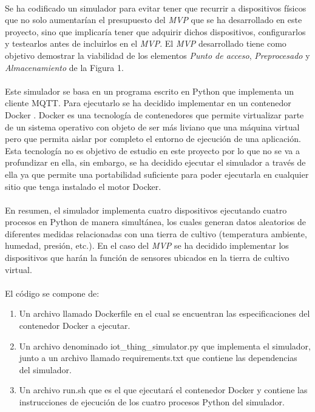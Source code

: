 \documentclass[../../memoria.tex]{subfiles}
\begin{document}
\paragraph{}
Se ha codificado un simulador para evitar tener que recurrir a dispositivos físicos que no solo aumentarían el presupuesto del \textit{MVP} que se ha desarrollado en este proyecto, sino que implicaría tener que adquirir dichos dispositivos, configurarlos y testearlos antes de incluirlos en el \textit{MVP}. El \textit{MVP} desarrollado tiene como objetivo demostrar la viabilidad de los elementos \textit{Punto de acceso}, \textit{Preprocesado} y \textit{Almacenamiento} de la Figura 1.



\paragraph{}
Este simulador se basa en un programa escrito en Python que implementa un cliente MQTT. Para ejecutarlo se ha decidido implementar en un contenedor Docker \cite{docker}. Docker es una tecnología de contenedores que permite virtualizar parte de un sistema operativo con objeto de ser más liviano que una máquina virtual pero que permita aislar por completo el entorno de ejecución de una aplicación. Esta tecnología no es objetivo de estudio en este proyecto por lo que no se va a profundizar en ella, sin embargo, se ha decidido ejecutar el simulador a través de ella ya que permite una portabilidad suficiente para poder ejecutarla en cualquier sitio que tenga instalado el motor Docker.

\paragraph{}
En resumen, el simulador implementa cuatro dispositivos ejecutando cuatro procesos en Python de manera simultánea, los cuales generan datos aleatorios de diferentes medidas relacionadas con una tierra de cultivo (temperatura ambiente, humedad, presión, etc.). En el caso del \textit{MVP} se ha decidido implementar los dispositivos que harán la función de sensores ubicados en la tierra de cultivo virtual.

\paragraph{}
El código se compone de:

\begin{enumerate}
    \item Un archivo llamado Dockerfile en el cual se encuentran las especificaciones del contenedor Docker a ejecutar.

    \item Un archivo denominado iot\_thing\_simulator.py que implementa el simulador, junto a un archivo llamado requirements.txt que contiene las dependencias del simulador.

    \item Un archivo run.sh que es el que ejecutará el contenedor Docker y contiene las instrucciones de ejecución de los cuatro procesos Python del simulador.
\end{enumerate}
\end{document}
